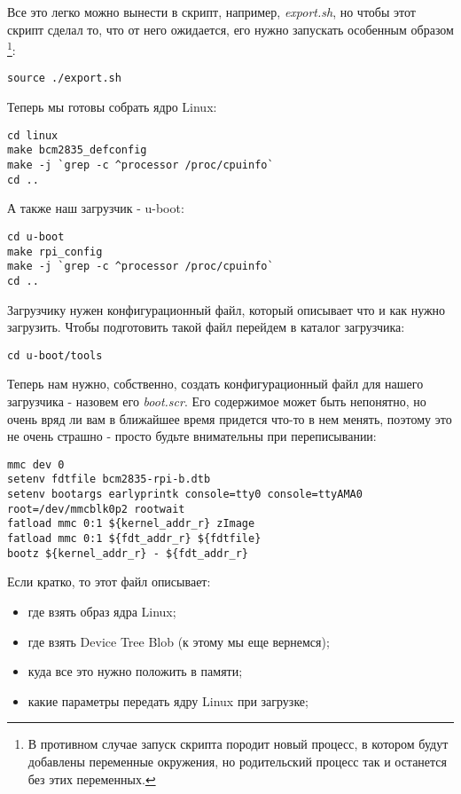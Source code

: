Все это легко можно вынести в скрипт, например, \emph{export.sh}, но чтобы этот
скрипт сделал то, что от него ожидается, его нужно запускать особенным образом
\footnote{В противном случае запуск скрипта породит новый процесс, в котором
будут добавлены переменные окружения, но родительский процесс так и останется
без этих переменных.}:
\begin{lstlisting}
source ./export.sh
\end{lstlisting}

Теперь мы готовы собрать ядро Linux:
\begin{lstlisting}
cd linux
make bcm2835_defconfig
make -j `grep -c ^processor /proc/cpuinfo`
cd ..
\end{lstlisting}

А также наш загрузчик - u-boot:
\begin{lstlisting}
cd u-boot
make rpi_config
make -j `grep -c ^processor /proc/cpuinfo`
cd ..
\end{lstlisting}

Загрузчику нужен конфигурационный файл, который описывает что и как нужно
загрузить. Чтобы подготовить такой файл перейдем в каталог загрузчика:
\begin{lstlisting}
cd u-boot/tools
\end{lstlisting}

Теперь нам нужно, собственно, создать конфигурационный файл для нашего
загрузчика - назовем его \emph{boot.scr}. Его содержимое может быть непонятно,
но очень вряд ли вам в ближайшее время придется что-то в нем менять, поэтому это
не очень страшно - просто будьте внимательны при переписывании:
\begin{lstlisting}
mmc dev 0
setenv fdtfile bcm2835-rpi-b.dtb
setenv bootargs earlyprintk console=tty0 console=ttyAMA0 root=/dev/mmcblk0p2 rootwait
fatload mmc 0:1 ${kernel_addr_r} zImage
fatload mmc 0:1 ${fdt_addr_r} ${fdtfile}
bootz ${kernel_addr_r} - ${fdt_addr_r}
\end{lstlisting}

Если кратко, то этот файл описывает:
\begin{itemize}
  \item где взять образ ядра Linux;
  \item где взять Device Tree Blob (к этому мы еще вернемся);
  \item куда все это нужно положить в памяти;
  \item какие параметры передать ядру Linux при загрузке;
\end{itemize}

